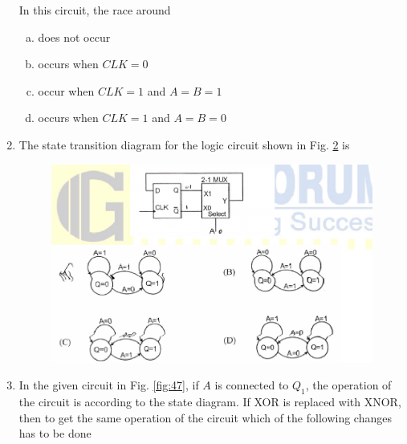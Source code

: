 \documentclass[journal,12pt,twocolumn]{IEEEtran}
\begin{document}
\begin{enumerate}
\begin{figure}
\caption{}

\label{fig:45}

\end{figure} 



In this circuit, the race around

\begin{enumerate}[(a)]

\item does not occur

\item occurs when $CLK =0$

\item occur when $CLK = 1$ and $A = B = 1$ 

\item occurs when $CLK = 1$ and $A = B = 0$

\end{enumerate}

\item The state transition diagram for the logic circuit shown in Fig.  \ref{fig:46}  is 

\begin{figure}

\centering

\includegraphics[width=\columnwidth]{./figs/52.eps}

\caption{}

\label{fig:46}

\end{figure} 




\item In the given circuit in Fig.  \ref{fig:47}, if $A$ is connected to $Q_1$, the operation of the circuit is according to the state diagram. If XOR is replaced with XNOR, then to get the same operation of the circuit which of the following changes has to be done


\end{enumerate}
\end{document}

